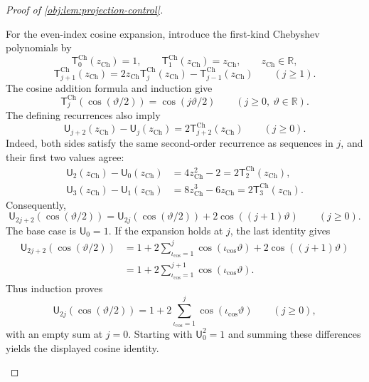 \begin{proof}[Proof of \cref{obj:lem:projection-control}]
\begin{enumerate}
For the even-index cosine expansion, introduce the first-kind Chebyshev polynomials by
\[
\mathsf T^{\mathrm{Ch}}_0(z_{\mathrm{Ch}})=1,
\qquad
\mathsf T^{\mathrm{Ch}}_1(z_{\mathrm{Ch}})=z_{\mathrm{Ch}},
\qquad z_{\mathrm{Ch}}\in\mathbb R,
\]
\[
\mathsf T^{\mathrm{Ch}}_{j+1}(z_{\mathrm{Ch}})
=2z_{\mathrm{Ch}}\mathsf T^{\mathrm{Ch}}_j(z_{\mathrm{Ch}})
 -\mathsf T^{\mathrm{Ch}}_{j-1}(z_{\mathrm{Ch}})
\qquad(j\ge1).
\]
The cosine addition formula and induction give
\[
\mathsf T^{\mathrm{Ch}}_j(\cos(\vartheta/2))
=\cos(j\vartheta/2)
\qquad(j\ge0,\ \vartheta\in\mathbb R).
\]
The defining recurrences also imply
\[
\mathsf U_{j+2}(z_{\mathrm{Ch}})-\mathsf U_j(z_{\mathrm{Ch}})
=2\mathsf T^{\mathrm{Ch}}_{j+2}(z_{\mathrm{Ch}})
\qquad(j\ge0).
\]
Indeed, both sides satisfy the same second-order recurrence as sequences in \(j\), and their first two values agree:
\[
\begin{aligned}
\mathsf U_2(z_{\mathrm{Ch}})-\mathsf U_0(z_{\mathrm{Ch}})
&=4z_{\mathrm{Ch}}^2-2
 =2\mathsf T^{\mathrm{Ch}}_2(z_{\mathrm{Ch}}),\\
\mathsf U_3(z_{\mathrm{Ch}})-\mathsf U_1(z_{\mathrm{Ch}})
&=8z_{\mathrm{Ch}}^3-6z_{\mathrm{Ch}}
 =2\mathsf T^{\mathrm{Ch}}_3(z_{\mathrm{Ch}}).
\end{aligned}
\]
Consequently,
\[
\mathsf U_{2j+2}(\cos(\vartheta/2))
=\mathsf U_{2j}(\cos(\vartheta/2))
 +2\cos((j+1)\vartheta)
\qquad(j\ge0).
\]
The base case is \(\mathsf U_0=1\). If the expansion holds at \(j\), the last identity gives
\[
\begin{aligned}
\mathsf U_{2j+2}(\cos(\vartheta/2))
&=1+2\sum_{\iota_{\mathrm{cos}}=1}^{j}
 \cos(\iota_{\mathrm{cos}}\vartheta)
 +2\cos((j+1)\vartheta)\\
&=1+2\sum_{\iota_{\mathrm{cos}}=1}^{j+1}
 \cos(\iota_{\mathrm{cos}}\vartheta).
\end{aligned}
\]
Thus induction proves
\[
\mathsf U_{2j}(\cos(\vartheta/2))
=1+2\sum_{\iota_{\mathrm{cos}}=1}^{j}
 \cos(\iota_{\mathrm{cos}}\vartheta)
\qquad(j\ge0),
\]
with an empty sum at \(j=0\).
Starting with \(\mathsf U_0^2=1\) and summing these differences yields the displayed cosine identity.


\end{enumerate}
\end{proof}
